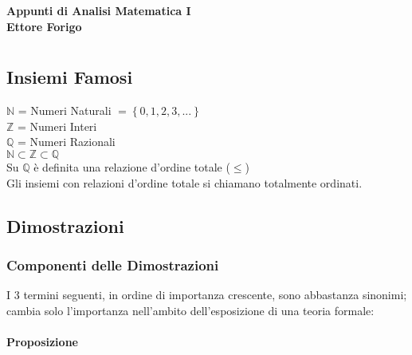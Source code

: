 \documentclass[a4paper, twoside, italian, 11pt]{book}
\newcommand{\braces}[1] {\left \{ #1 \right \}}
\newcommand{\N}{\mathbb{N}}
\newcommand{\Z}{\mathbb{Z}}
\newcommand{\Q}{\mathbb{Q}}
\begin{document}
\pagestyle{headings}

\frontmatter

\begin{titlepage}
	\begin{center}
		{\huge \bfseries Appunti di Analisi Matematica I \\}
		\vspace{1.5cm}
		{\Large \bfseries Ettore Forigo}
	\end{center}
\end{titlepage}

\mainmatter

\chapter{}



\section{Insiemi Famosi}

\noindent
$\N$ = Numeri Naturali $= \braces{0, 1, 2, 3, ...}$ \\
$\Z$ = Numeri Interi \\
$\Q$ = Numeri Razionali \\

\noindent
$\N \subset \Z \subset \Q$ \\

\noindent
Su $\Q$ è definita una relazione d'ordine totale  ($\leq$) \\

\noindent
Gli insiemi con relazioni d'ordine totale si chiamano totalmente ordinati.



\section{Dimostrazioni}


\subsection{Componenti delle Dimostrazioni}

\noindent
I 3 termini seguenti, in ordine di importanza crescente, sono abbastanza sinonimi; cambia solo l'importanza nell'ambito dell'esposizione di una teoria formale:


\subsubsection{Proposizione}
\end{document}
